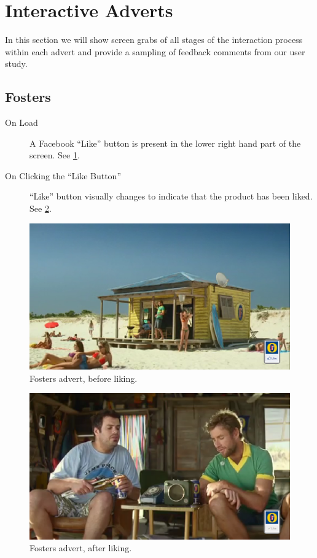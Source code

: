 \section{Interactive Adverts}
In this section we will show screen grabs of all stages of the interaction process within each advert and provide a sampling of feedback comments from our user study.

\subsection{Fosters}
	\begin{description}
		\item[On Load]{A Facebook ``Like'' button is present in the lower right hand part of the screen. See \ref{fig:fosters1}.}
		\item[On Clicking the ``Like Button'']{``Like'' button visually changes to indicate that the product has been liked. See \ref{fig:fosters2}.}
	\end{description}

	\begin{figure}[th]
		\centering
		\includegraphics[width=\textwidth,height=0.5\textheight,keepaspectratio]{images/adverts/fosters-1.png}
		\caption{Fosters advert, before liking.}
		\label{fig:fosters1}
	\end{figure}

	\begin{figure}[th]
		\centering
		\includegraphics[width=\textwidth,height=0.5\textheight,keepaspectratio]{images/adverts/fosters-2.png}
		\caption{Fosters advert, after liking.}
		\label{fig:fosters2}
	\end{figure}

